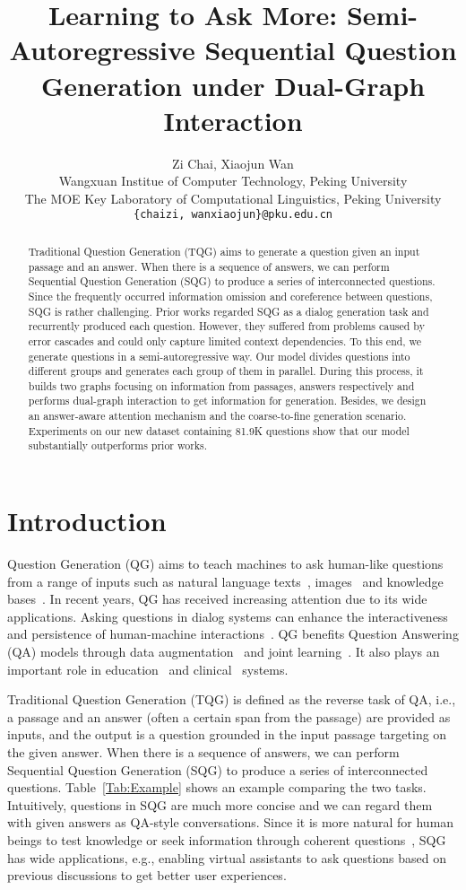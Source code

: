 \documentclass[11pt,a4paper]{article}
\title{Learning to Ask More: Semi-Autoregressive Sequential Question Generation under Dual-Graph Interaction}
\author{ 
	Zi Chai, Xiaojun Wan \\
	Wangxuan Institue of Computer Technology, Peking University \\ 
	The MOE Key Laboratory of Computational Linguistics, Peking University \\
	\texttt{\{chaizi, wanxiaojun\}@pku.edu.cn}
}
\date{}
\begin{document}
\maketitle
\begin{abstract}
Traditional Question Generation (TQG) aims to generate a question given an input passage and an answer.
When there is a sequence of answers, we can perform Sequential Question Generation (SQG) to produce a series of interconnected questions. Since the frequently occurred information omission and coreference between questions, SQG is rather challenging.
Prior works regarded SQG as a dialog generation task and recurrently produced each question. However, they suffered from problems caused by error cascades and could only capture limited context dependencies.
To this end, we generate questions in a semi-autoregressive way. Our model divides questions into different groups and generates each group of them in parallel. During this process, it builds two graphs focusing on information from passages, answers respectively and performs dual-graph interaction to get information for generation. Besides, we design an answer-aware attention mechanism and the coarse-to-fine generation scenario. 
Experiments on our new dataset containing 81.9K questions show that our model substantially outperforms prior works.
\end{abstract}


\section{Introduction}
Question Generation (QG) aims to teach machines to ask human-like questions from a range of inputs such as natural language texts~\cite{du2017learning}, images~\cite{mostafazadeh2016generating} and knowledge bases~\cite{serban2016generating}. 
In recent years, QG has received increasing attention due to its wide applications. Asking questions in dialog systems can enhance the interactiveness and persistence of human-machine interactions~\cite{Wang2018learning}. QG benefits Question Answering (QA) models through data augmentation~\cite{duan2017question} and joint learning~\cite{sun2019joint}. It also plays an important role in education~\cite{heilman2010good} and clinical~\cite{weizenbaum1966eliza} systems.

Traditional Question Generation (TQG) is defined as the reverse task of QA, i.e., a passage and an answer (often a certain span from the passage) are provided as inputs, and the output is a question grounded in the input passage targeting on the given answer. 
When there is a sequence of answers, we can perform Sequential Question Generation (SQG) to produce a series of interconnected questions. 
Table~\ref{Tab:Example} shows an example comparing the two tasks. Intuitively, questions in SQG are much more concise and we can regard them with given answers as QA-style conversations.
Since it is more natural for human beings to test knowledge or seek information through coherent questions~\cite{reddy2019coqa}, SQG has wide applications, e.g., enabling virtual assistants to ask questions based on previous discussions to get better user experiences.
\end{document}
